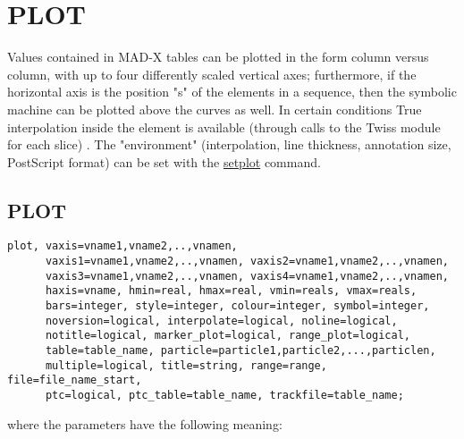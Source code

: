 
\chapter{PLOT}


Values contained in MAD-X tables can be plotted in the form column
versus column, with up to four differently scaled vertical axes;
furthermore, if the horizontal axis is the position "s" of the elements
in a sequence, then the symbolic machine can be plotted above the curves
as well. In certain conditions True interpolation inside the element is
available (through calls to the Twiss module for each slice) .  The
"environment" (interpolation, line thickness, annotation size,
PostScript format) can be set with the \hyperlink{setplot}{setplot}
command.   


\section{PLOT}	
\begin{verbatim}
plot, vaxis=vname1,vname2,..,vnamen,
      vaxis1=vname1,vname2,..,vnamen, vaxis2=vname1,vname2,..,vnamen,
      vaxis3=vname1,vname2,..,vnamen, vaxis4=vname1,vname2,..,vnamen,
      haxis=vname, hmin=real, hmax=real, vmin=reals, vmax=reals, 
      bars=integer, style=integer, colour=integer, symbol=integer, 
      noversion=logical, interpolate=logical, noline=logical,
      notitle=logical, marker_plot=logical, range_plot=logical, 
      table=table_name, particle=particle1,particle2,...,particlen,
      multiple=logical, title=string, range=range, file=file_name_start, 
      ptc=logical, ptc_table=table_name, trackfile=table_name; 
\end{verbatim} 
where the parameters have the following meaning: 

